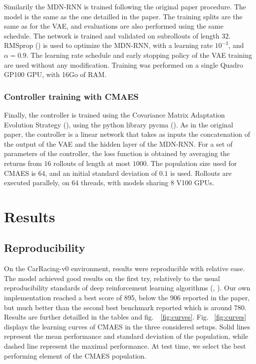 \documentclass[10pt,a4paper,onecolumn]{article}
\begin{document}
Similarily the MDN-RNN is trained following the original paper
procedure. The model is the same as the one detailled in the paper. The
training splits are the same as for the VAE, and evaluations are also
performed using the same schedule. The network is trained and validated
on subrollouts of length \(32\). RMSprop (\textcite{rmsprop}) is used to
optimize the MDN-RNN, with a learning rate \(10^{-3}\), and
\(\alpha=0.9\). The learning rate schedule and early stopping policy of
the VAE training are used without any modification. Training was
performed on a single Quadro GP100 GPU, with 16Go of RAM.

\hypertarget{controller-training-with-cmaes}{%
\subsubsection{Controller training with
CMAES}\label{controller-training-with-cmaes}}

Finally, the controller is trained using the Covariance Matrix
Adaptation Evolution Strategy (\textcite{hansen}), using the python
library pycma (\textcite{pycma}). As in the original paper, the
controller is a linear network that takes as inputs the concatenation of
the output of the VAE and the hidden layer of the MDN-RNN. For a set of
parameters of the controller, the loss function is obtained by averaging
the returns from \(16\) rollouts of length at most \(1000\). The
population size used for CMAES is \(64\), and an initial standard
deviation of \(0.1\) is used. Rollouts are executed parallely, on \(64\)
threads, with models sharing \(8\) V100 GPUs.

\hypertarget{results}{%
\section{Results}\label{results}}

\hypertarget{reproducibility}{%
\subsection{Reproducibility}\label{reproducibility}}

On the CarRacing-v0 environment, results were reproducible with relative
ease. The model achieved good results on the first try, relatively to
the usual reproducibility standards of deep reinforcement learning
algorithms (\textcite{rlblogpost}, \textcite{henderson}). Our own
implementation reached a best score of 895, below the 906 reported in
the paper, but much better than the second best benchmark reported which
is around 780. Results are further detailled in the tables and
fig.~~\ref{fig:curves}. Fig. ~\ref{fig:curves} displays the learning
curves of CMAES in the three considered setups. Solid lines represent
the mean performance and standard deviation of the population, while
dashed line represent the maximal performance. At test time, we select
the best performing element of the CMAES population.
\end{document}
